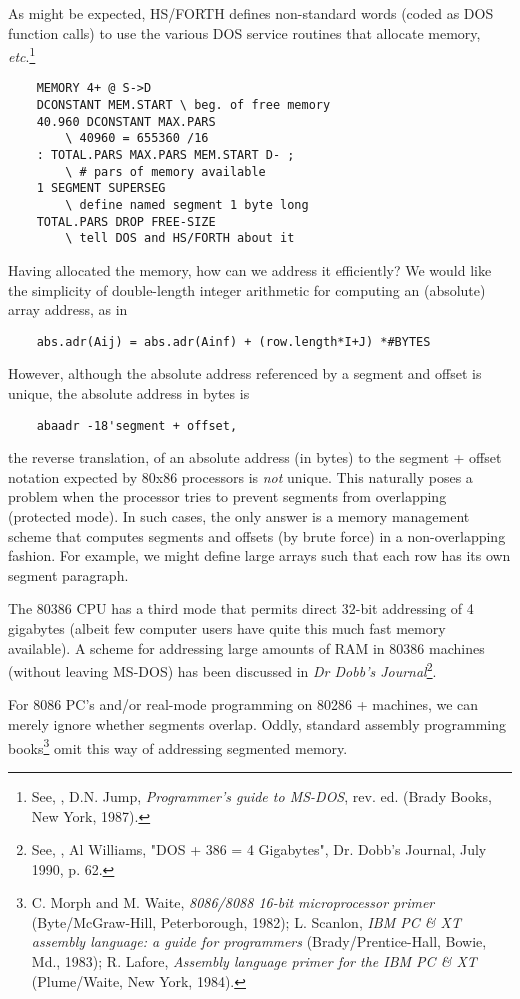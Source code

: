 As might be expected, HS/FORTH defines non-standard words (coded as DOS function calls) to use the various DOS service routines that allocate memory, \textit{etc}.\footnote{See, \eg, D.N. Jump, \textit{Programmer's guide to MS-DOS}, rev. ed. (Brady Books, New York, 1987).}

\begin{lstlisting}
    MEMORY 4+ @ S->D
    DCONSTANT MEM.START \ beg. of free memory
    40.960 DCONSTANT MAX.PARS
        \ 40960 = 655360 /16
    : TOTAL.PARS MAX.PARS MEM.START D- ;
        \ # pars of memory available
    1 SEGMENT SUPERSEG
        \ define named segment 1 byte long
    TOTAL.PARS DROP FREE-SIZE
        \ tell DOS and HS/FORTH about it
\end{lstlisting}

Having allocated the memory, how can we address it efficiently? We would like the simplicity of double-length integer arithmetic for computing an (absolute) array address, as in

\begin{lstlisting}
    abs.adr(Aij) = abs.adr(Ainf) + (row.length*I+J) *#BYTES
\end{lstlisting}

However, although the absolute address referenced by a segment and offset is unique, \ie the absolute address in bytes is

\begin{lstlisting}
    abaadr -18'segment + offset,
\end{lstlisting}

the reverse translation, of an absolute address (in bytes) to the segment + offset notation expected by 80x86 processors is \textit{not} unique. This naturally poses a problem when the processor tries to prevent segments from overlapping (protected mode). In such cases, the only answer is a memory management scheme that computes segments and offsets (by brute force) in a non-overlapping fashion. For example, we might define large arrays such that each row has its own segment paragraph.

The 80386 CPU has a third mode that permits direct 32-bit addressing of 4 gigabytes (albeit few computer users have quite this much fast memory available). A scheme for addressing large amounts of RAM in 80386 machines (without leaving MS-DOS) has been discussed in \textit{Dr Dobb's Journal}\footnote{See, \eg, Al Williams, "DOS + 386 = 4 Gigabytes", Dr. Dobb's Journal, July 1990, p. 62.}.

For 8086 PC's and/or real-mode programming on 80286 + machines, we can merely ignore whether segments overlap. Oddly, standard assembly programming books\footnote{C. Morph and M. Waite, \textit{8086/8088 16-bit microprocessor primer} (Byte/McGraw-Hill, Peterborough, 1982); L. Scanlon, \textit{IBM PC \& XT assembly language: a guide for programmers} (Brady/Prentice-Hall, Bowie, Md., 1983); R. Lafore, \textit{Assembly language primer for the IBM PC \& XT} (Plume/Waite, New York, 1984).} omit this way of addressing segmented memory.

